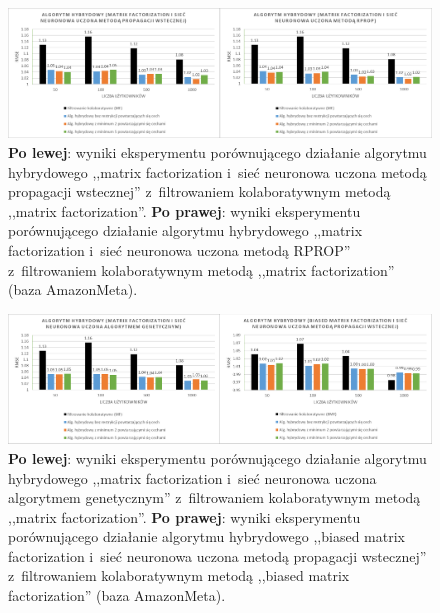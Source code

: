 \documentclass[twoside]{iisthesis}
\begin{document}
		\begin{figure}
			\centering
			\includegraphics[width=1\textwidth]{am_exphybrid2_1}			
			\caption{\textbf{Po lewej}: wyniki eksperymentu porównującego działanie algorytmu hybrydowego ,,matrix factorization i~sieć neuronowa uczona metodą propagacji wstecznej'' z~filtrowaniem kolaboratywnym metodą ,,matrix factorization''. \textbf{Po prawej}: wyniki eksperymentu porównującego działanie algorytmu hybrydowego ,,matrix factorization i~sieć neuronowa uczona metodą RPROP'' z~filtrowaniem kolaboratywnym metodą ,,matrix factorization'' (baza AmazonMeta).}
			\label{fig:am_exphybrid2_1}
		\end{figure}
		
		\begin{figure}
			\centering
			\includegraphics[width=1\textwidth]{am_exphybrid2_2}			
			\caption{\textbf{Po lewej}: wyniki eksperymentu porównującego działanie algorytmu hybrydowego ,,matrix factorization i~sieć neuronowa uczona algorytmem genetycznym'' z~filtrowaniem kolaboratywnym metodą ,,matrix factorization''. \textbf{Po prawej}: wyniki eksperymentu porównującego działanie algorytmu hybrydowego ,,biased matrix factorization i~sieć neuronowa uczona metodą propagacji wstecznej'' z~filtrowaniem kolaboratywnym metodą ,,biased matrix factorization'' (baza AmazonMeta).}
			\label{fig:am_exphybrid2_2}
		\end{figure}
		
\end{document}
